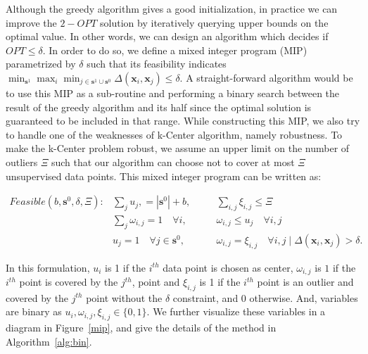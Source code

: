\documentclass{article} %
\begin{document}
Although the greedy algorithm gives a good initialization, in practice we can improve the $2-OPT$ solution by
iteratively querying upper bounds on the optimal value. In other words, we can design an algorithm which decides if $OPT
\leq \delta$. In order to do so, we define a mixed integer program (MIP) parametrized by $\delta$ such that its
feasibility indicates $\min_{\mathbf{s}^1} \max_i \min_{j \in \mathbf{s}^1 \cup \mathbf{s}^0}
\Delta(\mathbf{x}_i,\mathbf{x}_j) \leq \delta$. A straight-forward algorithm would be to use this MIP as a sub-routine and
performing a binary search between the result of the greedy algorithm and its half since the optimal solution is
guaranteed to be included in that range. While constructing this MIP, we also try to handle one of the weaknesses of
k-Center algorithm, namely robustness. To make the k-Center problem robust, we assume an upper limit on the number of
outliers $\Xi$ such that our algorithm can choose not to cover at most $\Xi$ unsupervised data points. This mixed
integer program can be written as:


\begin{equation} 
\begin{aligned}
Feasible(b,\mathbf{s}^0,\delta, \Xi):  &\sum_j  u_j, = |\mathbf{s}^0|+ b,  \quad &&  \sum_{i,j} \xi_{i,j} \leq \Xi \\
&\sum_j \omega_{i,j} = 1\quad \forall  i, \quad && \omega_{i,j} \leq u_j \quad \forall  i,j \\
   & u_j =1 \quad \forall j\in \mathbf{s}^0, \quad && \omega_{i,j} = \xi_{i,j} \quad  \forall i,j \mid   \Delta(\mathbf{x}_i,\mathbf{x}_j)  > \delta .
\end{aligned}
\label{eqmip}
\end{equation}

In this formulation, $u_i$ is 1 if the $i^{th}$ data point is chosen as center, $\omega_{i,j}$ is $1$ if the $i^{th}$
point is covered by the $j^{th}$, point and $\xi_{i,j}$ is 1 if the $i^{th}$ point is an outlier and covered by the
$j^{th}$ point without the $\delta$ constraint, and $0$ otherwise. And, variables are binary as $u_i, \omega_{i,j},
\xi_{i,j} \in \{0,1\}$. We further visualize these variables in a diagram in Figure~\ref{mip}, and give the details of
the method in Algorithm~\ref{alg:bin}. 
\end{document}
